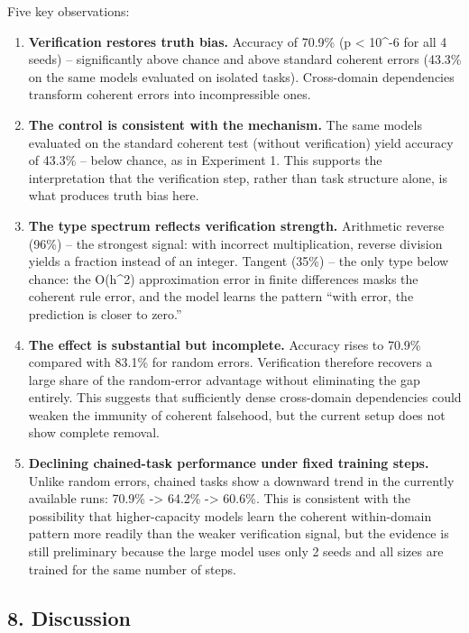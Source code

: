 \documentclass[
  11pt,
]{article}
\begin{document}
Five key observations:

\begin{enumerate}
\def\labelenumi{\arabic{enumi}.}
\item
  \textbf{Verification restores truth bias.} Accuracy of 70.9\% (p
  \textless{} 10\^{}-6 for all 4 seeds) -- significantly above chance
  and above standard coherent errors (43.3\% on the same models
  evaluated on isolated tasks). Cross-domain dependencies transform
  coherent errors into incompressible ones.
\item
  \textbf{The control is consistent with the mechanism.} The same models
  evaluated on the standard coherent test (without verification) yield
  accuracy of 43.3\% -- below chance, as in Experiment 1. This supports
  the interpretation that the verification step, rather than task
  structure alone, is what produces truth bias here.
\item
  \textbf{The type spectrum reflects verification strength.} Arithmetic
  reverse (96\%) -- the strongest signal: with incorrect multiplication,
  reverse division yields a fraction instead of an integer. Tangent
  (35\%) -- the only type below chance: the O(h\^{}2) approximation
  error in finite differences masks the coherent rule error, and the
  model learns the pattern ``with error, the prediction is closer to
  zero.''
\item
  \textbf{The effect is substantial but incomplete.} Accuracy rises to
  70.9\% compared with 83.1\% for random errors. Verification therefore
  recovers a large share of the random-error advantage without
  eliminating the gap entirely. This suggests that sufficiently dense
  cross-domain dependencies could weaken the immunity of coherent
  falsehood, but the current setup does not show complete removal.
\item
  \textbf{Declining chained-task performance under fixed training
  steps.} Unlike random errors, chained tasks show a downward trend in
  the currently available runs: 70.9\% -\textgreater{} 64.2\%
  -\textgreater{} 60.6\%. This is consistent with the possibility that
  higher-capacity models learn the coherent within-domain pattern more
  readily than the weaker verification signal, but the evidence is still
  preliminary because the large model uses only 2 seeds and all sizes
  are trained for the same number of steps.
\end{enumerate}

\subsection{8. Discussion}\label{discussion}
\end{document}
